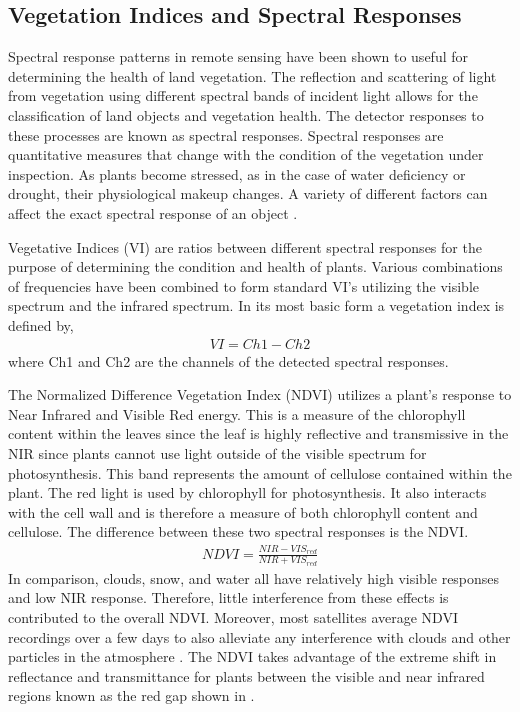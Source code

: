 \subsection{Vegetation Indices and Spectral Responses}
Spectral response patterns in remote sensing have been shown to useful \cite{mississippi}\cite{schott}\cite{harris} for determining the health of land vegetation.  The reflection and scattering of light from vegetation using different spectral bands of incident light allows for the classification of land objects and vegetation health.  The detector responses to these processes are known as spectral responses.  Spectral responses are quantitative measures that change with the condition of the vegetation under inspection.  As plants become stressed, as in the case of water deficiency or drought, their physiological makeup changes.  A variety of different factors can affect the exact spectral response of an object \cite{remotesensing}.

Vegetative Indices (VI) are ratios between different spectral responses for the purpose of determining the condition and health of plants.  Various combinations of frequencies have been combined to form standard VI’s utilizing the visible spectrum and the infrared spectrum. In its most basic form a vegetation index is defined by,
%
\begin{align}
    VI = Ch1 - Ch2
\end{align}
%
where Ch1 and Ch2 are the channels of the detected spectral responses.

The Normalized Difference Vegetation Index (NDVI) utilizes a plant's response to Near Infrared and Visible Red energy.  This is a measure of the chlorophyll content within the leaves since the leaf is highly reflective and transmissive in the NIR since plants cannot use light outside of the visible spectrum for photosynthesis.  This band represents the amount of cellulose contained within the plant.  The red light is used by chlorophyll for photosynthesis.  It also interacts with the cell wall and is therefore a measure of both chlorophyll content and cellulose.  The difference between these two spectral responses is the NDVI.
%
\begin{align}
    NDVI = \frac{NIR - VIS_{red}}{NIR + VIS_{red}}
\end{align}
%
In comparison, clouds, snow, and water all have relatively high visible responses and low NIR response.  Therefore, little interference from these effects is contributed to the overall NDVI.  Moreover, most satellites average NDVI recordings over a few days to also alleviate any interference with clouds and other particles in the atmosphere \cite{remotesensing}.
The NDVI takes advantage of the extreme shift in reflectance and transmittance for plants between the visible and near infrared regions known as the red gap shown in \cite{vanderbilt}.

